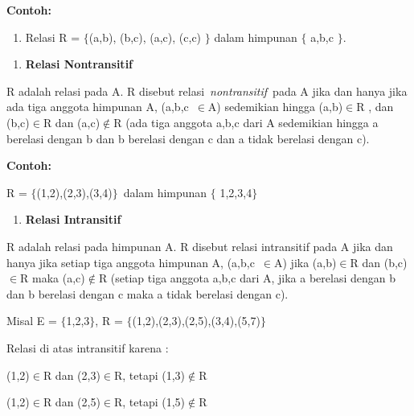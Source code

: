\documentclass[11pt,fleqn]{book} %
\begin{document}
\noindent \textbf{}

\noindent \textbf{Contoh:}

\begin{enumerate}
\item  Relasi R = $\{$(a,b), (b,c), (a,c), (c,c) $\}$ dalam himpunan $\{$ a,b,c $\}$.
\end{enumerate}

\noindent 

\begin{enumerate}
\item  \textbf{Relasi Nontransitif}
\end{enumerate}

\noindent 

\noindent R adalah relasi pada A. R disebut relasi~\textit{nontransitif}~pada A jika dan hanya jika ada tiga anggota himpunan A, (a,b,c~$\mathrm{\in }$A) sedemikian hingga (a,b)$\mathrm{\in }$R , dan (b,c)$\mathrm{\in }$R dan (a,c)$\mathrm{\notin }$R (ada tiga anggota a,b,c dari A sedemikian hingga a berelasi dengan b dan b berelasi dengan c dan a tidak berelasi dengan c).

\noindent 

\noindent \textbf{Contoh:}

\noindent R = $\{$(1,2),(2,3),(3,4)$\}$~dalam himpunan $\{$ 1,2,3,4$\}$

\noindent 

\begin{enumerate}
\item  \textbf{Relasi Intransitif}
\end{enumerate}

\noindent 

\noindent R adalah relasi pada himpunan A. R disebut relasi intransitif pada A jika dan hanya jika setiap tiga anggota himpunan A, (a,b,c~$\mathrm{\in }$A) jika (a,b)$\mathrm{\in }$R dan (b,c)$\mathrm{\in }$R maka (a,c)$\mathrm{\notin }$R (setiap tiga anggota a,b,c dari A, jika a berelasi dengan b dan b berelasi dengan c maka a tidak berelasi dengan c).

\noindent 

\noindent Misal E = $\{$1,2,3$\}$, R = $\{$(1,2),(2,3),(2,5),(3,4),(5,7)$\}$

\noindent Relasi di atas intransitif karena :

\noindent (1,2)$\mathrm{\in }$R dan (2,3)$\mathrm{\in }$R, tetapi (1,3)$\mathrm{\notin }$R

\noindent (1,2)$\mathrm{\in }$R dan (2,5)$\mathrm{\in }$R, tetapi (1,5)$\mathrm{\notin }$R
\end{document}
